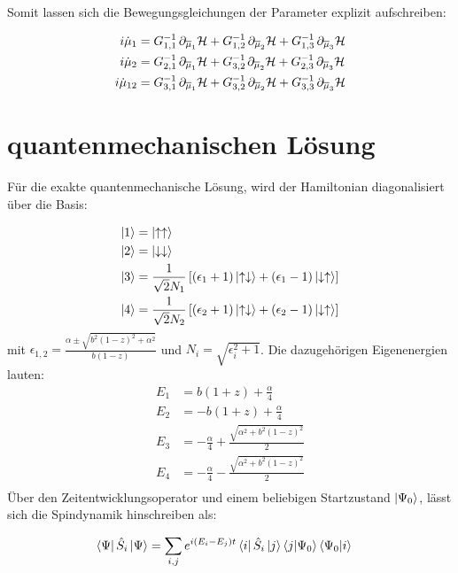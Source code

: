 Somit lassen sich die Bewegungsgleichungen der Parameter explizit aufschreiben:

\begin{align}
    i\dot{\mu}_1 &= G_{1,1}^{-1}\thinspace \partial_{\overline{\mu}_1}\mathcal{H} + G_{1,2}^{-1}\thinspace\partial_{\overline{\mu}_2}\mathcal{H} + G_{1,3}^{-1}\thinspace\partial_{\overline{\mu}_3}\mathcal{H} \\
    i\dot{\mu}_2 &= G_{2,1}^{-1}\thinspace\partial_{\overline{\mu}_1}\mathcal{H} + G_{3,2}^{-1\thinspace}\partial_{\overline{\mu}_2}\mathcal{H} + G_{2,3}^{-1}\thinspace\partial_{\overline{\mu}_3}\mathcal{H} \\
    i\dot{\mu}_{12} &= G_{3,1}^{-1}\thinspace\partial_{\overline{\mu}_1}\mathcal{H} + G_{3,2}^{-1}\thinspace\partial_{\overline{\mu}_2}\mathcal{H} + G_{3,3}^{-1}\thinspace\partial_{\overline{\mu}_3}\mathcal{H} 
\end{align}



\section{quantenmechanischen Lösung}
Für die exakte quantenmechanische Lösung, wird der Hamiltonian diagonalisiert über die Basis:

\begin{align}
    \ket{1} &= \ket{\uparrow\uparrow}   \\
    \ket{2} &= \ket{\downarrow\downarrow} \\
    \ket{3} &= \frac{1}{\sqrt{2}N_1}\left[(\epsilon_1+1)\ket{\uparrow\downarrow} +(\epsilon_1-1)\ket{\downarrow\uparrow} \right]\\
    \ket{4} &= \frac{1}{\sqrt{2}N_2}\left[(\epsilon_2+1)\ket{\uparrow\downarrow} +(\epsilon_2-1)\ket{\downarrow\uparrow} \right]
\end{align}
mit $\epsilon_{1,2} = \frac{\alpha \pm \sqrt{b^2(1-z)^2+\alpha^2} }{b(1-z)} $ und $N_{i} = \sqrt{\epsilon_i^2 + 1}$. Die dazugehörigen Eigenenergien lauten:
\begin{align}
    E_1 &= b(1+z) + \frac{\alpha}{4}\\
    E_2 &= -b(1+z) + \frac{\alpha}{4}\\
    E_3 &= -\frac{\alpha}{4} + \frac{\sqrt{\alpha^2 + b^2(1-z)^2}}{2}\\
    E_4 &= -\frac{\alpha}{4} - \frac{\sqrt{\alpha^2 + b^2(1-z)^2}}{2}\\
\end{align}
\noindent Über den Zeitentwicklungsoperator und einem beliebigen Startzustand $\ket{\Psi_0}$, lässt sich die Spindynamik hinschreiben als:

\begin{align}
    \bra{\Psi}\hat{S}_i\ket{\Psi} &= \sum_{i,j}e^{i(E_i-E_j)t}\bra{i}\hat{S}_i\ket{j}\bra{j}\ket{\Psi_0}\bra{\Psi_0}\ket{i}
\end{align}